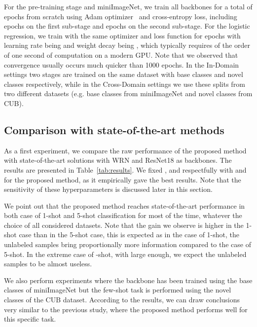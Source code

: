 \documentclass[a4paper,conference]{IEEEtran}
\begin{document}
For the pre-training stage and miniImageNet, we train all backbones for a total of  epochs from scratch using Adam optimizer~\cite{kingma2014adam} and cross-entropy loss, including  epochs on the first sub-stage and  epochs on the second sub-stage. For the logistic regression, we train with the same optimizer and loss function for  epochs with learning rate being  and weight decay being , which typically requires of the order of one second of computation on a modern GPU. Note that we observed that convergence usually occurs much quicker than 1000 epochs. In the In-Domain settings two stages are trained on the same dataset with base classes and novel classes respectively, while in the Cross-Domain settings we use these splits from two different datasets (e.g. base classes from miniImageNet and novel classes from CUB).


\subsection{Comparison with state-of-the-art methods}

As a first experiment, we compare the raw performance of the proposed method with state-of-the-art solutions with WRN and ResNet18 as backbones. The results are presented in Table~\ref{tab:results}. We fixed ,  and  respectfully with  and  for the proposed method, as it empirically gave the best results. Note that the sensitivity of these hyperparameters is discussed later in this section.

We point out that the proposed method reaches state-of-the-art performance in both case of 1-shot and 5-shot classification for most of the time, whatever the choice of all considered datasets. Note that the gain we observe is higher in the 1-shot case than in the 5-shot case, this is expected as in the case of 1-shot, the unlabeled samples bring proportionally more information compared to the case of 5-shot. In the extreme case of -shot, with  large enough, we expect the unlabeled samples to be almost useless.

We also perform experiments where the backbone has been trained using the base classes of miniImageNet but the few-shot task is performed using the novel classes of the CUB dataset. According to the results, we can draw conclusions very similar to the previous study, where the proposed method performs well for this specific task.
\end{document}
